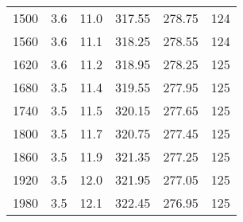 \begin{table}[H]
\begin{tabular}{S S S S S S}
    1500 & 3.6 & 11.0 & 317.55 & 278.75 & 124 \\
    1560 & 3.6 & 11.1 & 318.25 & 278.55 & 124 \\
    1620 & 3.6 & 11.2 & 318.95 & 278.25 & 125 \\
    1680 & 3.5 & 11.4 & 319.55 & 277.95 & 125 \\
    1740 & 3.5 & 11.5 & 320.15 & 277.65 & 125 \\
    1800 & 3.5 & 11.7 & 320.75 & 277.45 & 125 \\
    1860 & 3.5 & 11.9 & 321.35 & 277.25 & 125 \\
    1920 & 3.5 & 12.0 & 321.95 & 277.05 & 125 \\
    1980 & 3.5 & 12.1 & 322.45 & 276.95 & 125 \\








      \bottomrule
    \end{tabular}
\end{table}
